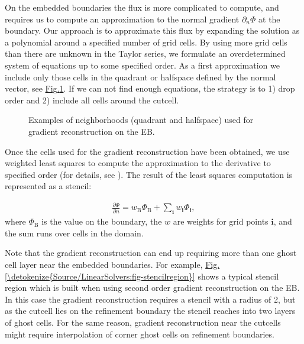 \documentclass[letterpaper,10pt,english]{sphinxmanual}
\let\sphinxpxdimen\pdfpxdimen\else\newdimen\sphinxpxdimen
\begin{document}
\sphinxAtStartPar
On the embedded boundaries the flux is more complicated to compute, and requires us to compute an approximation to the normal gradient \(\partial_n\Phi\) at the boundary.
Our approach is to approximate this flux by expanding the solution as a polynomial around a specified number of grid cells.
By using more grid cells than there are unknown in the Taylor series, we formulate an over\sphinxhyphen{}determined system of equations up to some specified order.
As a first approximation we include only those cells in the quadrant or half\sphinxhyphen{}space defined by the normal vector, see \hyperref[\detokenize{Source/LinearSolvers:fig-gradientreconstruction}]{Fig.\@ \ref{\detokenize{Source/LinearSolvers:fig-gradientreconstruction}}}.
If we can not find enough equations, the strategy is to 1) drop order and 2) include all cells around the cut\sphinxhyphen{}cell.

\begin{figure}[htb]
\centering
\capstart

\noindent\sphinxincludegraphics[width=360\sphinxpxdimen]{{GradientReconstruction}.png}
\caption{Examples of neighborhoods (quadrant and half\sphinxhyphen{}space) used for gradient reconstruction on the EB.}\label{\detokenize{Source/LinearSolvers:id2}}\label{\detokenize{Source/LinearSolvers:fig-gradientreconstruction}}\end{figure}

\sphinxAtStartPar
Once the cells used for the gradient reconstruction have been obtained, we use weighted least squares to compute the approximation to the derivative to specified order (for details, see {\hyperref[\detokenize{Utilities/LeastSquares:chap-leastsquares}]{}}).
The result of the least squares computation is represented as a stencil:

\label{\detokenize{Source/LinearSolvers:eq-dirichletelliptic}}\begin{equation*}
\begin{split}\frac{\partial\Phi}{\partial n} = w_{\textrm{B}}\Phi_{\textrm{B}} + \sum_{\mathbf{i}} w_{\mathbf{i}}\Phi_{\mathbf{i}},\end{split}
\end{equation*}
\sphinxAtStartPar
where \(\Phi_{\textrm{B}}\) is the value on the boundary, the \(w\) are weights for grid points \(\mathbf{i}\), and the sum runs over cells in the domain.

\sphinxAtStartPar
Note that the gradient reconstruction can end up requiring more than one ghost cell layer near the embedded boundaries.
For example, \hyperref[\detokenize{Source/LinearSolvers:fig-stencilregion}]{Fig.\@ \ref{\detokenize{Source/LinearSolvers:fig-stencilregion}}} shows a typical stencil region which is built when using second order gradient reconstruction on the EB.
In this case the gradient reconstruction requires a stencil with a radius of 2, but as the cut\sphinxhyphen{}cell lies on the refinement boundary the stencil reaches into two layers of ghost cells.
For the same reason, gradient reconstruction near the cut\sphinxhyphen{}cells might require interpolation of corner ghost cells on refinement boundaries.
\end{document}
